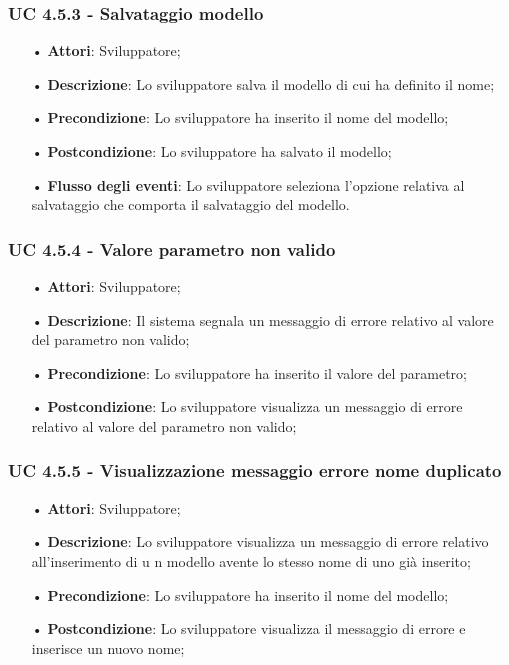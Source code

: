 \subsubsection{UC 4.5.3 - Salvataggio modello}
\begin{itemize}
\item[•]\textbf{Attori}: Sviluppatore;
\item[•]\textbf{Descrizione}: Lo sviluppatore salva il modello di cui ha definito il nome;
\item[•]\textbf{Precondizione}: Lo sviluppatore ha inserito il nome del modello;
\item[•]\textbf{Postcondizione}: Lo sviluppatore ha salvato il modello;
\item[•]\textbf{Flusso degli eventi}:  Lo sviluppatore seleziona l'opzione relativa al salvataggio che comporta il salvataggio del modello.
\end{itemize}

\subsubsection{UC 4.5.4 - Valore parametro non valido}
\begin{itemize}
\item[•]\textbf{Attori}: Sviluppatore;
\item[•]\textbf{Descrizione}: Il sistema segnala un messaggio di errore relativo al valore del parametro non valido;
\item[•]\textbf{Precondizione}: Lo sviluppatore ha inserito il valore del parametro;
\item[•]\textbf{Postcondizione}: Lo sviluppatore visualizza un messaggio di errore relativo al valore del parametro non valido;
\end{itemize}
\subsubsection{UC 4.5.5 - Visualizzazione messaggio errore nome duplicato}
\begin{itemize}
\item[•]\textbf{Attori}: Sviluppatore;
\item[•]\textbf{Descrizione}: Lo sviluppatore visualizza un messaggio di errore relativo all'inserimento di u
n modello avente lo stesso nome di uno già inserito;
\item[•]\textbf{Precondizione}: Lo sviluppatore ha inserito il nome del modello;
\item[•]\textbf{Postcondizione}: Lo sviluppatore visualizza il messaggio di errore e inserisce un nuovo nome;
\end{itemize}


